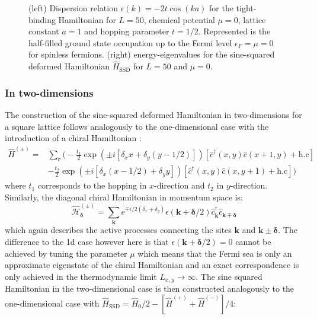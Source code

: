 \documentclass[11pt, a4paper, oneside]{book}
\theoremstyle{definition} %
\begin{document}
\begin{figure}[h]
\begin{subfigure}[t]{0.49\textwidth}
\end{subfigure}
\caption{(left) Dispersion relation $\epsilon(k) = -2t\cos(ka)$ for the tight-binding Hamiltonian for $L=50$, chemical potential $\mu = 0$, lattice constant $a = 1$ and hopping parameter $t = 1/2$. Represented is the half-filled ground state occupation up to the Fermi level $\epsilon_F = \mu =0$ for spinless fermions. (right) energy-eigenvalues for the sine-squared deformed Hamiltonian $\hat{H}_{\text{SSD}}$ for $L = 50$ and $\mu = 0$.}
\label{fig:dispersion_relation1D}
\end{figure}




\subsubsection{In two-dimensions}
The construction of the sine-squared deformed Hamiltonian in two-dimensions for a square lattice follows analogously to the one-dimensional case with the introduction of a chiral Hamiltonian \cite{Maruyama}:
\begin{equation}
\begin{split}
	\hat{H}^{(\pm)} = & \sum_{\mathbf{r}}\Big( -\frac{t_1}{2}  \exp(\pm i[\delta_x x + \delta_y( y - 1/2)]) \left[\hat{c}^\dagger(x,y) \hat{c}(x+1, y) + \text{h.c}\right] \\
		&- \frac{t_2}{2} \exp(\pm i [\delta_x(x-1/2) + \delta_y y]) \left[\hat{c}^\dagger(x,y) \hat{c}(x, y+1) + \text{h.c} \right] \Big)
\end{split}
\end{equation}
where $t_1$ corresponds to the hopping in $x$-direction and $t_2$ in $y$-direction. Similarly, the diagonal chiral Hamiltonian in momentum space is:
\begin{equation}
	\hat{\mathcal{H}}_{\bm{\delta}}^{(\pm)} = \sum_{\mathbf{k}} e^{\mp i/2(\delta_x + \delta_y)} \epsilon(\mathbf{k} + \bm{\delta}/2)\hat{c}_{\mathbf{k}}^\dagger \hat{c}_{\mathbf{k} \mp \bm{\delta}}
\end{equation}
which again describes the active processes connecting the sites $\mathbf{k}$ and $\mathbf{k} \pm \bm{\delta}$. The difference to the 1d case however here is that $\epsilon(\mathbf{k} + \bm{\delta}/2) = 0$ cannot be achieved by tuning the parameter $\mu$ which means that the Fermi sea is only an approximate eigenstate of the chiral Hamiltonian and an exact correspondence is only achieved in the thermodynamic limit $L_{x,y} \rightarrow \infty$\cite{Maruyama}. The sine squared Hamiltonian in the two-dimensional case is then constructed analogously to the one-dimensional case with $\hat{H}_{\text{SSD}} = \hat{H}_0/2 - [\hat{H}^{(+)} + \hat{H}^{(-)}]/4$:
\end{document}
